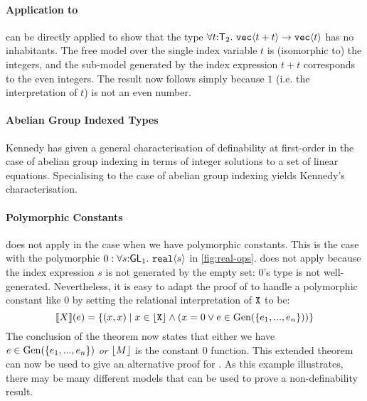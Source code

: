 
\paragraph{Application to }
 can be directly applied to show that the
type $\forall t\mathord:\mathsf{T}_2.~\textup{\texttt{vec}}\langle t + t \rangle \to
\textup{\texttt{vec}}\langle t \rangle$ has no inhabitants. The free model over the single
index variable $t$ is (isomorphic to) the integers, and the sub-model
generated by the index expression $t + t$ corresponds to the even
integers. The result now follows simply because $1$ (i.e. the
interpretation of $t$) is not an even number.

\paragraph{Abelian Group Indexed Types} Kennedy
\cite{kennedy97relational} has given a general characterisation of
definability at first-order in the case of abelian group indexing in
terms of integer solutions to a set of linear equations. Specialising
 to the case of abelian group indexing
yields Kennedy's characterisation.

\paragraph{Polymorphic Constants}  does not
apply in the case when we have polymorphic constants. This is the case
with the polymorphic $0 : \forall
s\mathord:\mathsf{GL}_1.~\textup{\texttt{real}}\langle s \rangle$ in
\autoref{fig:real-ops}.  does not apply
because the index expression $s$ is not generated by the empty set:
$0$'s type is not well-generated. Nevertheless, it is easy to adapt
the proof of  to handle a polymorphic
constant like $0$ by setting the relational interpretation of
$\textup{\texttt{X}}$ to be:
\begin{displaymath}
  \llbracket X \rrbracket(e) = \{ (x,x) \mathrel| x \in \left\lfloor \textup{\texttt{X}} \right\rfloor \land (x = 0 \lor e \in \mathrm{Gen}(\{e_1,...,e_n\})) \}
\end{displaymath}
The conclusion of the theorem now states that either we have $e \in
\mathrm{Gen}(\{e_1,...,e_n\})$ \emph{or} $\left\lfloor{M}\right\rfloor$ is the constant $0$
function. This extended theorem can now be used to give an alternative
proof for . As this example illustrates,
there may be many different models that can be used to prove a
non-definability result.

